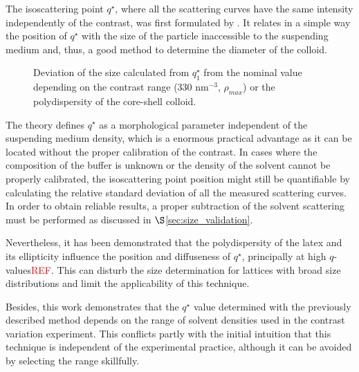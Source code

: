 The isoscattering point $q^{\star}$, where all the scattering curves have the same intensity independently of the contrast, was first formulated by \citep{kawaguchi_x-ray_1983-1}. It relates in a simple way the position of $q^{\star}$ with the size of the particle inaccessible to the suspending medium and, thus, a good method to determine the diameter of the colloid.

\begin{figure}%
	\centering

	\caption{Deviation of the size calculated from $q_1^{\star}$ from the nominal value depending on the contrast range (330 nm$^{-3}$, $\rho_{max}$) or the polydispersity of the core-shell colloid.}

\end{figure}

The theory defines $q^{\star}$ as a morphological parameter independent of the suspending medium density, which is a enormous practical advantage as it can be located without the proper calibration of the contrast. In cases where the composition of the buffer is unknown or the density of the solvent cannot be properly calibrated, the isoscattering point position might still be quantifiable by calculating the relative standard deviation of all the measured scattering curves. In order to obtain reliable results, a proper subtraction of the solvent scattering must be performed as discussed in $\S$\ref{sec:size_validation}.

Nevertheless, it has been demonstrated that the polydispersity of the latex and its ellipticity influence the position and diffuseness of $q^{\star}$, principally at high $q$-values\textcolor{red}{REF}. This can disturb the size determination for lattices with broad size distributions and limit the applicability of this technique.

Besides, this work demonstrates that the $q^{\star}$ value determined with the previously described method depends on the range of solvent densities used in the contrast variation experiment. This conflicts partly with the initial intuition that this technique is independent of the experimental practice, although it can be avoided by selecting the range skillfully.

